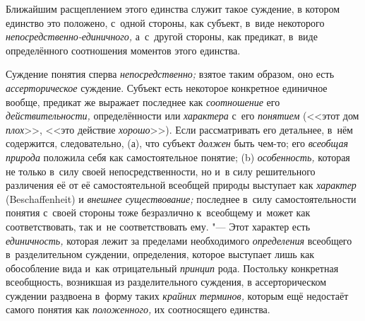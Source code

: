 Ближайшим расщеплением этого единства служит такое суждение, в
котором единство это положено, с~одной стороны, как субъект, в~виде
некоторого
{\em непосредственно-единичного,}
а~с~другой стороны, как предикат, в~виде определённого
соотношения моментов этого единства.


Суждение понятия сперва
{\em непосредственно;}
взятое таким образом, оно есть
{\em ассерторическое}
суждение. Субъект есть некоторое конкретное единичное вообще,
предикат же выражает последнее как
{\em соотношение} его
{\em действительности,}
определённости или
{\em характера} с~его
{\em понятием} (<<этот дом
{\em плох}>>, <<это
действие {\em хорошо}>>).
Если рассматривать его детальнее, в~нём содержится,
следовательно, (а), что субъект
{\em должен} быть чем-то;
его {\em всеобщая природа}
положила себя как самостоятельное понятие; (b)
{\em особенность,}
которая не только в~силу своей непосредственности, но и~в
силу решительного различения её от её самостоятельной всеобщей природы
выступает как {\em характер}
(Beschaf\-fenheit) и
{\em внешнее существование;}
последнее в~силу самостоятельности понятия с~своей стороны
тоже безразлично к~всеобщему и~может как соответствовать, так и~не
соответствовать ему. "--- Этот характер есть
{\em единичность,}
которая лежит за пределами необходимого
{\em определения}
всеобщего в~разделительном суждении, определения, которое
выступает лишь как обособление вида и~как отрицательный
{\em принцип} рода.
Постольку конкретная всеобщность, возникшая из разделительного суждения, в
ассерторическом суждении раздвоена в~форму таких
{\em крайних терминов,}
которым ещё недостаёт самого понятия как
{\em положенного,} их
соотносящего
единства.


